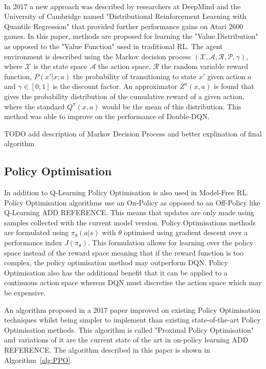 \documentclass{article}
\begin{document}
\\
\sloppy In 2017 a new approach was described by researchers at DeepMind and the University of Cambridge named "Distributional Reinforcement Learning with Quantile Regression"\cite{Dabney2017DistributionalRegression} that provided further performance gains on Atari 2600 games. In this paper, methods are proposed for learning the "Value Distribution" as opposed to the "Value Function" used in traditional RL. The agent environment is described using the Markov decision process $(\mathcal{X}, \mathcal{A}, \mathcal{R}, \mathcal{P}, \gamma)$, where $\mathcal{X}$ is the state space $\mathcal{A}$ the action space, $\mathcal{R}$ the random variable reward function, $P(x'|x;a)$ the probability of transitioning to state $x'$ given action $a$ and $\gamma \in [0,1]$ is the discount factor. An approximator $Z^\pi(x,a)$ is found that gives the probability distribution of the cumulative reward of a given action, where the standard $Q^\pi(x,a)$ would be the mean of this distribution. This method was able to improve on the performance of Double-DQN. 

TODO add description of Markov Decision Process and better explination of final algorithm

\subsection{Policy Optimisation}

In addition to Q-Learning Policy Optimisation is also used in Model-Free RL. Policy Optimisation algorithms use an On-Policy as opposed to an Off-Policy like Q-Learning ADD REFERENCE. This means that updates are only made using samples collected with the current model version. Policy Optimisations methods are formulated using $\pi_\theta(a|s)$ \cite{Huang2020Model-basedLearning} with $\theta$ optimised using gradient descent over a performance index $J(\pi_{\theta})$. This formulation allows for learning over the policy space instead of the reward space meaning that if the reward function is too complex, the policy optimisation method may outperform DQN. Policy Optimisation also has the additional benefit that it can be applied to a continuous action space whereas DQN must discretise the action space which may be expensive. 

An algorithm proposed in a 2017 paper\cite{Schulman2017ProximalAlgorithms} improved on existing Policy Optimisation techniques whilst being simpler to implement than existing state-of-the-art Policy Optimisation methods. This algorithm is called "Proximal Policy Optimisation" and variations of it are the current state of the art in on-policy learning ADD REFERENCE. The algorithm described in this paper is shown in Algorithm~\ref{alg:PPO}.
\end{document}
